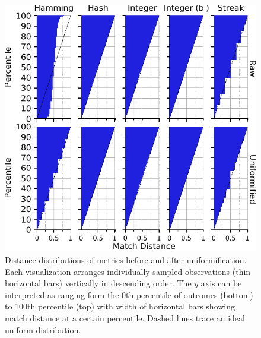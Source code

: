 \begin{figure}
\begin{center}

\includegraphics[width=\columnwidth]{img/uniformification/bitweight=0dot5+seed=1+title=low-score-distribution+_data_hathash_hash=75684cf1e73fb7f1+_script_fullcat_hash=c3113c80efb02374+ext=}
\caption{
Distance distributions of metrics before and after uniformification.
Each visualization arranges individually sampled observations (thin horizontal bars) vertically in descending order.
The $y$ axis can be interpreted as ranging form the 0th percentile of outcomes (bottom) to 100th percentile (top) with width of horizontal bars showing match distance at a certain percentile.
Dashed lines trace an ideal uniform distribution.
}
\label{fig:uniformification}

\end{center}
\end{figure}
